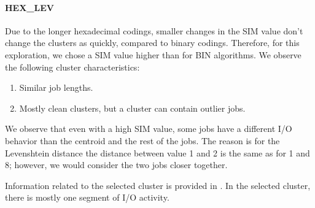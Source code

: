 \documentclass{jhps}
\begin{document}
\FloatBarrier
\paragraph{HEX\_LEV}
Due to the longer hexadecimal codings, smaller changes in the SIM value don't change the clusters as quickly,  compared to binary codings.
Therefore, for this exploration, we chose a SIM value higher than for BIN algorithms.
We observe the following cluster characteristics:
\begin{enumerate}
 \item Similar job lengths.
 \item Mostly clean clusters, but a cluster can contain outlier jobs.
\end{enumerate}

We observe that even with a high SIM value, some jobs have a different I/O behavior than the centroid and the rest of the jobs.
The reason is for the Levenshtein distance the distance between value 1 and 2 is the same as for 1 and 8; however, we would consider the two jobs closer together.

Information related to the selected cluster is provided in .
In the selected cluster, there is mostly one segment of I/O activity.
\end{document}
